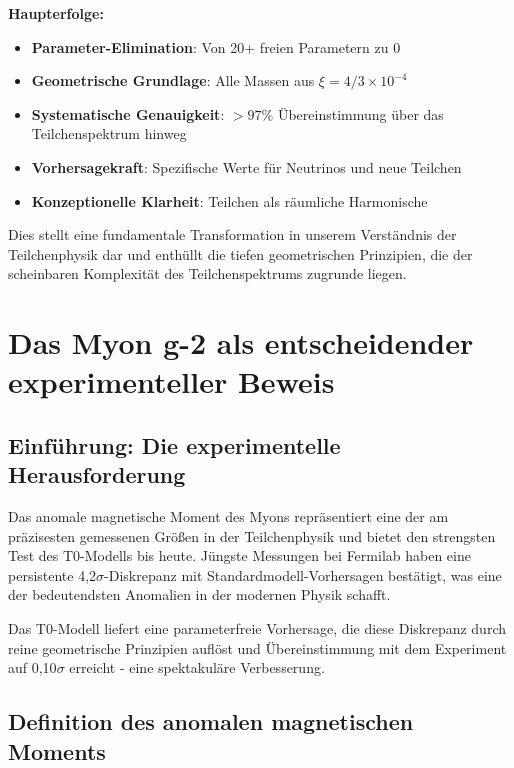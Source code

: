 \documentclass[12pt,a4paper]{report}
\begin{document}
\textbf{Haupterfolge:}

\begin{itemize}
	\item \textbf{Parameter-Elimination}: Von 20+ freien Parametern zu 0
	\item \textbf{Geometrische Grundlage}: Alle Massen aus $\xi = 4/3 \times 10^{-4}$
	\item \textbf{Systematische Genauigkeit}: $> 97\%$ Übereinstimmung über das Teilchenspektrum hinweg
	\item \textbf{Vorhersagekraft}: Spezifische Werte für Neutrinos und neue Teilchen
	\item \textbf{Konzeptionelle Klarheit}: Teilchen als räumliche Harmonische
\end{itemize}

Dies stellt eine fundamentale Transformation in unserem Verständnis der Teilchenphysik dar und enthüllt die tiefen geometrischen Prinzipien, die der scheinbaren Komplexität des Teilchenspektrums zugrunde liegen.

	
	\chapter{Das Myon g-2 als entscheidender experimenteller Beweis}
\label{chap:muon_g2}

\section{Einführung: Die experimentelle Herausforderung}
\label{sec:muon_g2_introduction}

Das anomale magnetische Moment des Myons repräsentiert eine der am präzisesten gemessenen Größen in der Teilchenphysik und bietet den strengsten Test des T0-Modells bis heute. Jüngste Messungen bei Fermilab haben eine persistente 4,2$\sigma$-Diskrepanz mit Standardmodell-Vorhersagen bestätigt, was eine der bedeutendsten Anomalien in der modernen Physik schafft.

Das T0-Modell liefert eine parameterfreie Vorhersage, die diese Diskrepanz durch reine geometrische Prinzipien auflöst und Übereinstimmung mit dem Experiment auf 0,10$\sigma$ erreicht - eine spektakuläre Verbesserung.

\section{Definition des anomalen magnetischen Moments}
\label{sec:anomalous_moment_definition}
\end{document}
